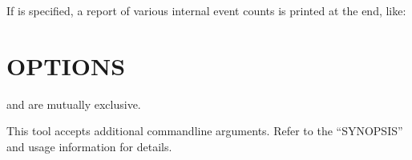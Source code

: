 \documentclass[letterpaper,10pt,english]{sphinxmanual}
\begin{document}
If {\hyperref[\detokenize{mariadb-schema-change:cmdoption-mariadb-schema-change-statistics}]{}} is specified, a report of various internal event counts
is printed at the end, like:

\begin{sphinxVerbatim}[commandchars=\\\{\}]
\end{sphinxVerbatim}


\section{OPTIONS}
\label{\detokenize{mariadb-schema-change:options}}
{\hyperref[\detokenize{mariadb-schema-change:cmdoption-mariadb-schema-change-dry-run}]{}} and {\hyperref[\detokenize{mariadb-schema-change:cmdoption-mariadb-schema-change-execute}]{}} are mutually exclusive.

This tool accepts additional command\sphinxhyphen{}line arguments.  Refer to the
“SYNOPSIS” and usage information for details.
\end{document}

